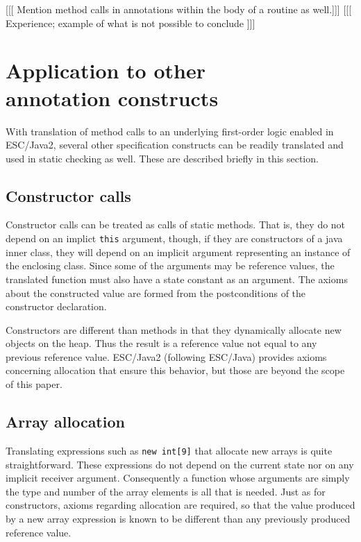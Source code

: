 \documentclass{sig-alternate}
\begin{document}
[[[ Mention method calls in annotations within the body of a routine as well.]]]
[[[ Experience; example of what is not possible to conclude ]]]

\section{Application to other \\ annotation constructs}

With translation of method calls to an underlying first-order logic enabled in ESC/Java2, 
several other specification constructs can be readily translated and used in static checking as 
well.  These are described briefly in this section.
 
\subsection{Constructor calls}

Constructor calls can be treated as calls of static methods.  That is, they do not depend on an
implict \texttt{this} argument, though, if they are constructors of a java inner class, they will depend 
on an implicit argument representing an instance of the enclosing class.  Since some of the 
arguments may be reference values, the translated function must also have a state constant
as an argument.  The axioms about the constructed value are formed from the postconditions
of the constructor declaration.

Constructors are different than methods in that they dynamically allocate new objects on the 
heap.  Thus the result is a reference value not equal to any previous reference value.  ESC/Java2
(following ESC/Java) provides axioms concerning allocation that ensure this behavior, but 
those are beyond the scope of this paper.

\subsection{Array allocation}

Translating expressions such as \texttt{new int[9]} that allocate new arrays is quite straightforward.
These expressions do not depend on the current state nor on any implicit receiver argument.
Consequently a function whose arguments are simply the type and number of the array 
elements is all that is needed.
Just as for constructors, axioms regarding allocation are required, 
so that the value produced by a new array
expression is known to be different than any previously produced reference value.
\end{document}
